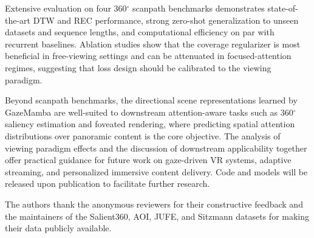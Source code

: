 \documentclass[sigconf]{acmart}
\begin{document}
Extensive evaluation on four 360$^\circ$ scanpath benchmarks demonstrates state-of-the-art DTW and REC performance, strong zero-shot generalization to unseen datasets and sequence lengths, and computational efficiency on par with recurrent baselines. Ablation studies show that the coverage regularizer is most beneficial in free-viewing settings and can be attenuated in focused-attention regimes, suggesting that loss design should be calibrated to the viewing paradigm.

Beyond scanpath benchmarks, the directional scene representations learned by GazeMamba are well-suited to downstream attention-aware tasks such as 360$^\circ$ saliency estimation and foveated rendering, where predicting spatial attention distributions over panoramic content is the core objective. The analysis of viewing paradigm effects and the discussion of downstream applicability together offer practical guidance for future work on gaze-driven VR systems, adaptive streaming, and personalized immersive content delivery. Code and models will be released upon publication to facilitate further research.

\begin{acks}
The authors thank the anonymous reviewers for their constructive feedback and the maintainers of the Salient360, AOI, JUFE, and Sitzmann datasets for making their data publicly available.
\end{acks}



\end{document}
